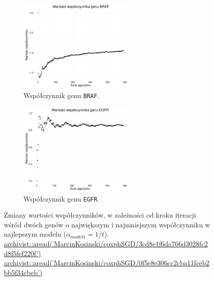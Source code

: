 \begin{figure}[hbt!]
  \begin{center}
   \begin{subfigure}[h!]{0.45\textwidth}
      \includegraphics[width=\textwidth, height=130pt]{Obrazki/analiza/fig8.pdf}
      \caption{Współczynnik genu \texttt{BRAF}.}
   \end{subfigure}     
   \begin{subfigure}[h!]{0.45\textwidth}
      \includegraphics[width=\textwidth, height=130pt]{Obrazki/analiza/fig9.pdf}
            \caption{Współczynnik genu \texttt{EGFR}.}
   \end{subfigure}  
      \end{center}
  \caption{\label{trajAnalisis} Zmiany wartości współczynników, w zależności od kroku iteracji wśród dwóch genów o największym i najmniejszym współczynniku w najlepszym modelu ($\alpha_{model1} = 1/t$). \\
\href{https://github.com/MarcinKosinski/coxphSGD/blob/master/gallery/3cd8e1f6da766d3028fc2d8f5fef220f.rda?raw=true}{archivist::aread('MarcinKosinski/coxphSGD/3cd8e1f6da766d3028fc2d8f5fef220f')} \\
\href{https://github.com/MarcinKosinski/coxphSGD/blob/master/gallery/0f5e8e306cc2cba11fceb2bb5f34cbeb.rda?raw=true}{archivist::aread('MarcinKosinski/coxphSGD/0f5e8e306cc2cba11fceb2bb5f34cbeb')}}
\end{figure}
 
